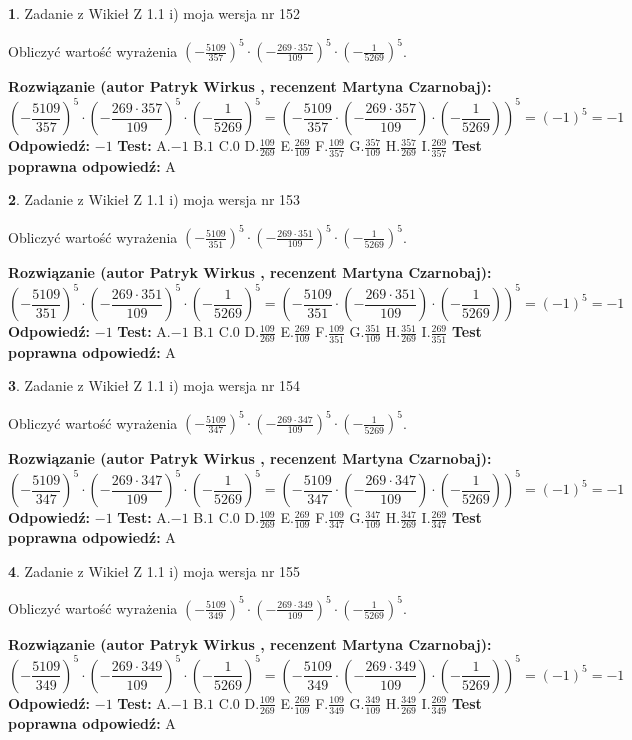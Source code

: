 \documentclass[12pt, a4paper]{article}
\theoremstyle{definition} %
\newtheorem{zad}{}
\newcommand{\zadStart}[1]{\begin{zad}#1\newline}
\newcommand{\zadStop}{\end{zad}}
\newcommand{\rozwStart}[2]{\noindent \textbf{Rozwiązanie (autor #1 , recenzent #2): }\newline}
\newcommand{\rozwStop}{\newline}
\newcommand{\odpStart}{\noindent \textbf{Odpowiedź:}\newline}
\newcommand{\odpStop}{\newline}
\newcommand{\testStart}{\noindent \textbf{Test:}\newline}
\newcommand{\testStop}{\newline}
\newcommand{\kluczStart}{\noindent \textbf{Test poprawna odpowiedź:}\newline}
\newcommand{\kluczStop}{\newline}
\begin{document}
\zadStart{Zadanie z Wikieł Z 1.1 i) moja wersja nr 152}

Obliczyć wartość wyrażenia $(-\frac{5109}{357})^{5} \cdot (-\frac{269 \cdot 357}{109})^{5} \cdot (-\frac{1}{5269})^{5}$.
\zadStop
\rozwStart{Patryk Wirkus}{Martyna Czarnobaj}
$$(-\frac{5109}{357})^{5} \cdot (-\frac{269 \cdot 357}{109})^{5} \cdot (-\frac{1}{5269})^{5} = (-\frac{5109}{357} \cdot (-\frac{269 \cdot 357}{109}) \cdot (-\frac{1}{5269}))^{5} = (-1)^{5} = -1$$
\rozwStop
\odpStart
$-1$
\odpStop
\testStart
A.$-1$ B.$1$ C.$0$ D.$\frac{109}{269}$ E.$\frac{269}{109}$
F.$\frac{109}{357}$ G.$\frac{357}{109}$
H.$\frac{357}{269}$
I.$\frac{269}{357}$
\testStop
\kluczStart
A
\kluczStop



\zadStart{Zadanie z Wikieł Z 1.1 i) moja wersja nr 153}

Obliczyć wartość wyrażenia $(-\frac{5109}{351})^{5} \cdot (-\frac{269 \cdot 351}{109})^{5} \cdot (-\frac{1}{5269})^{5}$.
\zadStop
\rozwStart{Patryk Wirkus}{Martyna Czarnobaj}
$$(-\frac{5109}{351})^{5} \cdot (-\frac{269 \cdot 351}{109})^{5} \cdot (-\frac{1}{5269})^{5} = (-\frac{5109}{351} \cdot (-\frac{269 \cdot 351}{109}) \cdot (-\frac{1}{5269}))^{5} = (-1)^{5} = -1$$
\rozwStop
\odpStart
$-1$
\odpStop
\testStart
A.$-1$ B.$1$ C.$0$ D.$\frac{109}{269}$ E.$\frac{269}{109}$
F.$\frac{109}{351}$ G.$\frac{351}{109}$
H.$\frac{351}{269}$
I.$\frac{269}{351}$
\testStop
\kluczStart
A
\kluczStop



\zadStart{Zadanie z Wikieł Z 1.1 i) moja wersja nr 154}

Obliczyć wartość wyrażenia $(-\frac{5109}{347})^{5} \cdot (-\frac{269 \cdot 347}{109})^{5} \cdot (-\frac{1}{5269})^{5}$.
\zadStop
\rozwStart{Patryk Wirkus}{Martyna Czarnobaj}
$$(-\frac{5109}{347})^{5} \cdot (-\frac{269 \cdot 347}{109})^{5} \cdot (-\frac{1}{5269})^{5} = (-\frac{5109}{347} \cdot (-\frac{269 \cdot 347}{109}) \cdot (-\frac{1}{5269}))^{5} = (-1)^{5} = -1$$
\rozwStop
\odpStart
$-1$
\odpStop
\testStart
A.$-1$ B.$1$ C.$0$ D.$\frac{109}{269}$ E.$\frac{269}{109}$
F.$\frac{109}{347}$ G.$\frac{347}{109}$
H.$\frac{347}{269}$
I.$\frac{269}{347}$
\testStop
\kluczStart
A
\kluczStop



\zadStart{Zadanie z Wikieł Z 1.1 i) moja wersja nr 155}

Obliczyć wartość wyrażenia $(-\frac{5109}{349})^{5} \cdot (-\frac{269 \cdot 349}{109})^{5} \cdot (-\frac{1}{5269})^{5}$.
\zadStop
\rozwStart{Patryk Wirkus}{Martyna Czarnobaj}
$$(-\frac{5109}{349})^{5} \cdot (-\frac{269 \cdot 349}{109})^{5} \cdot (-\frac{1}{5269})^{5} = (-\frac{5109}{349} \cdot (-\frac{269 \cdot 349}{109}) \cdot (-\frac{1}{5269}))^{5} = (-1)^{5} = -1$$
\rozwStop
\odpStart
$-1$
\odpStop
\testStart
A.$-1$ B.$1$ C.$0$ D.$\frac{109}{269}$ E.$\frac{269}{109}$
F.$\frac{109}{349}$ G.$\frac{349}{109}$
H.$\frac{349}{269}$
I.$\frac{269}{349}$
\testStop
\kluczStart
A
\kluczStop
\end{document}
